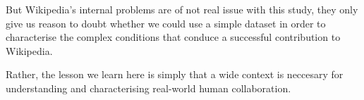 But Wikipedia's internal problems are of not real issue with this
study, they only give us reason to doubt whether we could use a simple
dataset in order to characterise the complex conditions that conduce a
successful contribution to Wikipedia.

Rather, the lesson we learn here is simply that a wide context is
neccesary for understanding and characterising real-world human
collaboration.
